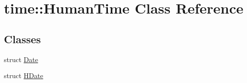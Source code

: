 \hypertarget{classtime_1_1_human_time}{}\section{time\+::Human\+Time Class Reference}
\label{classtime_1_1_human_time}
\subsection*{Classes}
\begin{DoxyCompactItemize}
\item 
struct \mbox{\hyperlink{structtime_1_1_human_time_1_1_date}{Date}}
\item 
struct \mbox{\hyperlink{structtime_1_1_human_time_1_1_h_date}{H\+Date}}
\end{DoxyCompactItemize}
